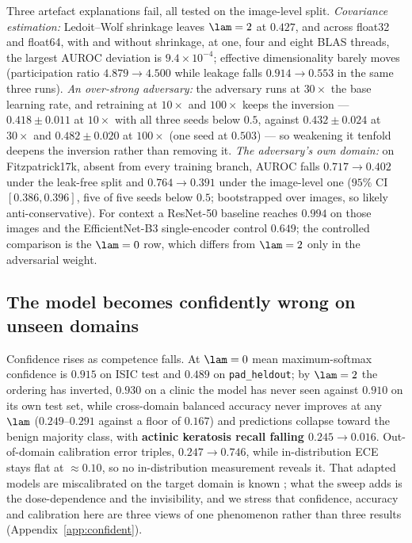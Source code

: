 Three artefact explanations fail, all tested on the image-level split.
\emph{Covariance estimation:} Ledoit--Wolf shrinkage leaves $\lam = 2$ at $0.427$,
and across float32 and float64, with and without shrinkage, at one, four and eight
BLAS threads, the largest AUROC deviation is $9.4 \times 10^{-4}$; effective
dimensionality barely moves (participation ratio $4.879 \to 4.500$ while leakage
falls $0.914 \to 0.553$ in the same three runs). \emph{An over-strong adversary:}
the adversary runs at $30\times$ the base learning rate, and retraining at
$10\times$ and $100\times$ keeps the inversion --- $0.418 \pm 0.011$ at $10\times$
with all three seeds below $0.5$, against $0.432 \pm 0.024$ at $30\times$ and
$0.482 \pm 0.020$ at $100\times$ (one seed at $0.503$) --- so weakening it tenfold
deepens the inversion rather than removing it. \emph{The adversary's own domain:}
on Fitzpatrick17k, absent from every training branch, AUROC falls
$0.717 \to 0.402$ under the leak-free split and $0.764 \to 0.391$ under the
image-level one ($95\%$ CI $[0.386, 0.396]$, five of five seeds below $0.5$;
bootstrapped over images, so likely anti-conservative). For context a ResNet-50
baseline reaches $0.994$ on those images and the EfficientNet-B3 single-encoder
control $0.649$; the controlled comparison is the $\lam = 0$ row, which differs from
$\lam = 2$ only in the adversarial weight.

\subsection{The model becomes confidently wrong on unseen domains}
\label{sec:confidently}

Confidence rises as competence falls. At $\lam = 0$ mean maximum-softmax confidence is
$0.915$ on ISIC test and $0.489$ on \texttt{pad\_heldout}; by $\lam = 2$ the ordering
has inverted, $0.930$ on a clinic the model has never seen against $0.910$ on its own
test set, while cross-domain balanced accuracy never improves at any $\lam$
($0.249$--$0.291$ against a floor of $0.167$) and predictions collapse toward the
benign majority class, with \textbf{actinic keratosis recall falling
$0.245 \to 0.016$}. Out-of-domain calibration error triples, $0.247 \to 0.746$, while
in-distribution ECE stays flat at $\approx 0.10$, so no in-distribution measurement
reveals it. That adapted models are miscalibrated on the target domain is known
\cite{wang2020}; what the sweep adds is the dose-dependence and the invisibility, and
we stress that confidence, accuracy and calibration here are three views of one
phenomenon rather than three results (Appendix~\ref{app:confident}).

